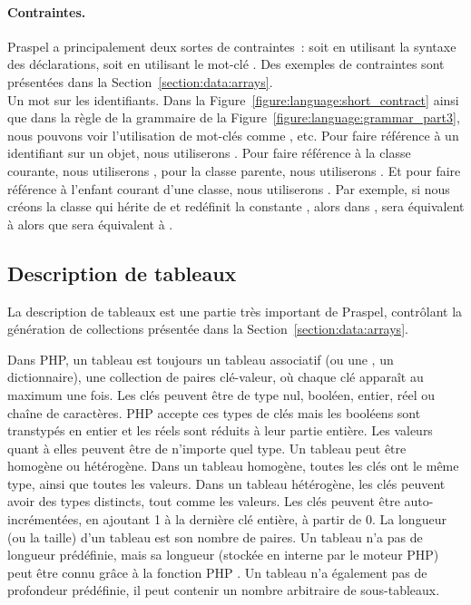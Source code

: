\paragraph{Contraintes.} Praspel a principalement deux sortes de contraintes~:
soit en utilisant la syntaxe des déclarations, soit en utilisant le mot-clé
. Des exemples de contraintes sont présentées dans la
Section~\ref{section:data:arrays}.
\\

Un mot sur les identifiants. Dans la Figure~\ref{figure:language:short_contract}
ainsi que dans la règle  de la grammaire de la
Figure~\ref{figure:language:grammar_part3}, nous pouvons voir l'utilisation de
mot-clés comme ,  etc. Pour faire référence à un
identifiant sur un objet, nous utiliserons . Pour faire référence à
la classe courante, nous utiliserons , pour la classe parente, nous
utiliserons . Et pour faire référence à l'enfant courant d'une
classe, nous utiliserons . Par exemple, si nous créons la classe
 qui hérite de  et redéfinit la constante
, alors dans ,  sera équivalent à
 alors que  sera équivalent à
.

\subsection{Description de tableaux}
\label{subsection:language:array}

La description de tableaux est une partie très important de Praspel, contrôlant
la génération de collections présentée dans la
Section~\ref{section:data:arrays}.

Dans PHP, un tableau est toujours un {\strong tableau associatif} (ou une
, un {\strong dictionnaire}), \ie une collection de paires
clé-valeur, où chaque clé apparaît au maximum une fois. Les clés peuvent être de
type nul, booléen, entier, réel ou chaîne de caractères. PHP accepte ces types
de clés mais les booléens sont transtypés en entier et les réels sont réduits à
leur partie entière. Les valeurs quant à elles peuvent être de n'importe quel
type. Un tableau peut être {\strong homogène} ou {\strong hétérogène}. Dans un
tableau homogène, toutes les clés ont le même type, ainsi que toutes les
valeurs. Dans un tableau hétérogène, les clés peuvent avoir des types distincts,
tout comme les valeurs.  Les clés peuvent être {\strong auto-incrémentées}, en
ajoutant 1 à la dernière clé entière, à partir de 0. La {\strong longueur} (ou
la {\strong taille}) d'un tableau est son nombre de paires. Un tableau n'a pas
de longueur prédéfinie, mais sa longueur (stockée en interne par le moteur PHP)
peut être connu grâce à la fonction PHP . Un tableau n'a également
pas de profondeur prédéfinie, \ie il peut contenir un nombre arbitraire de
sous-tableaux.

